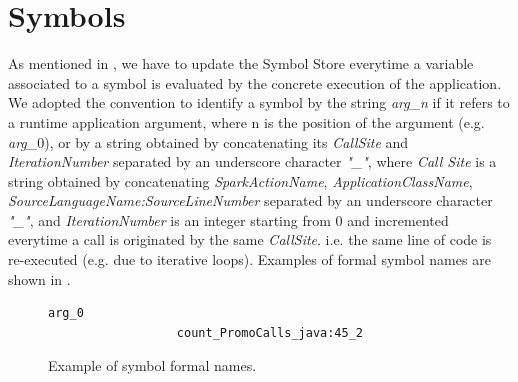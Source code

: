 


\section{Symbols}\label{sec:symbols}
As mentioned in , we have to update the Symbol Store everytime a variable associated to a symbol is evaluated by the concrete execution of the application. We adopted the convention to identify a symbol by the string \textit{arg\_n} if it refers to a runtime application argument, where n is the position of the argument (e.g. \textit{arg\_$0$}), or by a string obtained by concatenating its \textit{CallSite} and \textit{IterationNumber} separated by an underscore character \textit{"\_"}, where \textit{Call Site} is a string obtained by concatenating \textit{SparkActionName}, \textit{ApplicationClassName}, \textit{SourceLanguageName:SourceLineNumber} separated by an underscore character \textit{"\_"}, and  \textit{IterationNumber} is an integer starting from $0$ and incremented everytime a call is originated by the same \textit{CallSite}. i.e. the same line of code is re-executed (e.g. due to iterative loops). Examples of formal symbol names are shown in .
\begin{figure}[tbhp]
	\centering
	\begin{lstlisting}[basicstyle=\ttfamily\scriptsize]
		          arg_0
		          count_PromoCalls_java:45_2
	\end{lstlisting}
	\caption{Example of symbol formal names.}
	\label{fig:symbol_name}
\end{figure}

